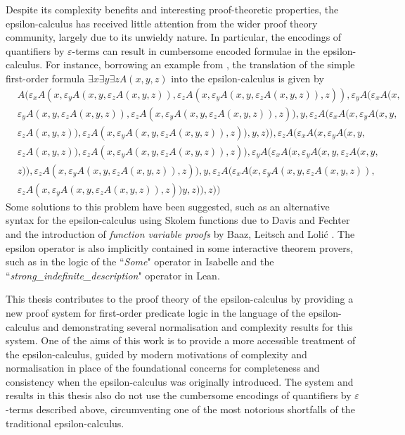 \documentclass[10pt]{article}
\theoremstyle{definition}\newtheorem{remark}[theorem]{Remark}
\theoremstyle{definition}\newtheorem{example}[theorem]{Example}
\theoremstyle{definition}\newtheorem{definition}[theorem]{Definition}
\begin{document}
	Despite its complexity benefits and interesting proof-theoretic properties, the epsilon-calculus has received little attention from the wider proof theory community, largely due to its unwieldy nature. In particular, the encodings of quantifiers by $\varepsilon$-terms can result in cumbersome encoded formulae in the epsilon-calculus. For instance, borrowing an example from \cite{BaazEpsilon}, the translation of the simple first-order formula $\exists x \exists y \exists z A(x, y, z)$ into the epsilon-calculus is given by
	\begin{align*}
		&A(\varepsilon_xA(x, \varepsilon_yA(x, y, \varepsilon_zA(x, y, z)), \varepsilon_zA(x, \varepsilon_yA(x, y, \varepsilon_zA(x, y, z)), z)), \varepsilon_yA(\varepsilon_xA(x, \\
		&\varepsilon_yA(x, y, \varepsilon_zA(x, y, z)), \varepsilon_zA(x, \varepsilon_yA(x, y, \varepsilon_zA(x, y, z)), z)), y, \varepsilon_zA(\varepsilon_xA(x, \varepsilon_yA(x, y, \\
		&\varepsilon_zA(x, y, z)), \varepsilon_zA(x, \varepsilon_yA(x, y, \varepsilon_zA(x, y, z)), z)), y, z)), \varepsilon_zA(\varepsilon_xA(x, \varepsilon_yA(x, y, \\
		&\varepsilon_zA(x, y, z)), \varepsilon_zA(x, \varepsilon_yA(x, y, \varepsilon_zA(x, y, z)), z)), \varepsilon_yA(\varepsilon_xA(x, \varepsilon_yA(x, y, \varepsilon_zA(x, y, \\
		&z)), \varepsilon_zA(x, \varepsilon_yA(x, y, \varepsilon_zA(x, y, z)), z)), y, \varepsilon_zA(\varepsilon_xA(x, \varepsilon_yA(x, y, \varepsilon_zA(x, y, z)), \\
		&\varepsilon_zA(x, \varepsilon_yA(x, y, \varepsilon_zA(x, y, z)), z))y, z)), z))
	\end{align*}
	Some solutions to this problem have been suggested, such as an alternative syntax for the epsilon-calculus using Skolem functions due to Davis and Fechter \cite{DavisFectherFreeVariable, FechterThesis} and the introduction of \textit{function variable proofs} by Baaz, Leitsch and Lolić \cite{BaazEpsilon}. The epsilon operator is also implicitly contained in some interactive theorem provers, such as in the logic of the ``\textit{Some}" operator in Isabelle and the ``\textit{strong\_indefinite\_description}" operator in Lean.
	
	This thesis contributes to the proof theory of the epsilon-calculus by providing a new proof system for first-order predicate logic in the language of the epsilon-calculus and demonstrating several normalisation and complexity results for this system. One of the aims of this work is to provide a more accessible treatment of the epsilon-calculus, guided by modern motivations of complexity and normalisation in place of the foundational concerns for completeness and consistency when the epsilon-calculus was originally introduced. The system and results in this thesis also do not use the cumbersome encodings of quantifiers by $\varepsilon$-terms described above, circumventing one of the most notorious shortfalls of the traditional epsilon-calculus.
	
\end{document}
